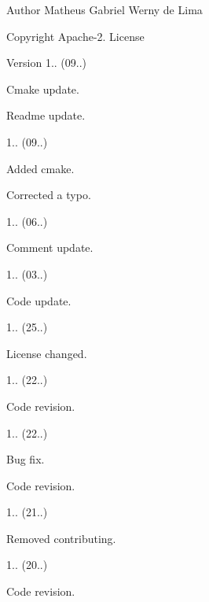 \begin{DoxyAuthor}{Author}
Matheus Gabriel Werny de Lima 
\end{DoxyAuthor}
\begin{DoxyCopyright}{Copyright}
Apache-\/2. License 
\end{DoxyCopyright}
\begin{DoxyVersion}{Version}
1.. (09..)
\begin{DoxyItemize}
\item Cmake update.
\item Readme update. 
\end{DoxyItemize}

1.. (09..)
\begin{DoxyItemize}
\item Added cmake.
\item Corrected a typo. 
\end{DoxyItemize}

1.. (06..)
\begin{DoxyItemize}
\item Comment update. 
\end{DoxyItemize}

1.. (03..)
\begin{DoxyItemize}
\item Code update. 
\end{DoxyItemize}

1.. (25..)
\begin{DoxyItemize}
\item License changed. 
\end{DoxyItemize}

1.. (22..)
\begin{DoxyItemize}
\item Code revision. 
\end{DoxyItemize}

1.. (22..)
\begin{DoxyItemize}
\item Bug fix.
\item Code revision. 
\end{DoxyItemize}

1.. (21..)
\begin{DoxyItemize}
\item Removed contributing. 
\end{DoxyItemize}

1.. (20..)
\begin{DoxyItemize}
\item Code revision. 
\end{DoxyItemize}


\end{DoxyVersion}
